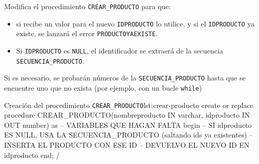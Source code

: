 \begin{homeworkProblem}

  Modifica el procedimiento \texttt{CREAR\_PRODUCTO} para que:
  \begin{itemize}
  \item   si recibe un valor para el nuevo \texttt{IDPRODUCTO} lo utilice,  y si el \texttt{IDPRODUCTO} ya existe, se lanzará el error \texttt{PRODUCTOYAEXISTE}.
  \item   Si \texttt{IDPRODUCTO} es \texttt{NULL}, el identificador se extraerá de la secuencia \texttt{SECUENCIA\_PRODUCTO}.  
  \end{itemize}

  


  \begin{Aviso}
    Si es necesario, se probarán números de la \texttt{SECUENCIA\_PRODUCTO} hasta que se encuentre uno que no exista (por ejemplo, con un bucle \texttt{while})
  \end{Aviso}


\begin{listadosql}{Creación del procedimiento \texttt{CREAR\_PRODUCTO}}{lst:crear-producto}
create or replace procedure CREAR_PRODUCTO(nombreproducto IN varchar, idproducto IN OUT number)
as 
  -- VARIABLES QUE HAGAN FALTA
begin
  -- SI idproducto ES NULL, USA LA SECUENCIA_PRODUCTO (saltando ids ya existentes)
  -- INSERTA EL PRODUCTO CON ESE ID
  -- DEVUELVO EL NUEVO ID EN idproducto
end;
/
\end{listadosql}

  
\end{homeworkProblem}


\newpage

